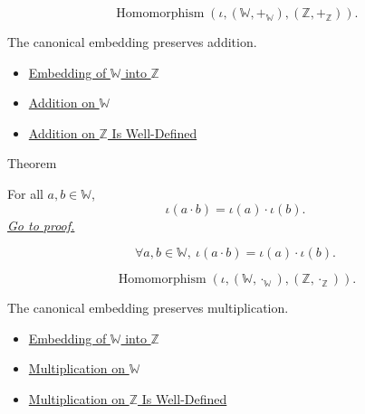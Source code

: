 \begin{remark*}
\[
\operatorname{Homomorphism}(\iota,(\mathbb{W},+_{\mathbb{W}}),(\mathbb{Z},+_{\mathbb{Z}})).
\]
\end{remark*}

\begin{remark*}[Interpretation]
The canonical embedding preserves addition.
\end{remark*}

\begin{dependencies}
\begin{itemize}
  \item \hyperref[def:canonical-embedding-w-into-z]{Embedding of $\mathbb{W}$ into $\mathbb{Z}$}
  \item \hyperref[def:addition-on-w]{Addition on $\mathbb{W}$}
  \item \hyperref[thm:addition-on-z-well-defined]{Addition on $\mathbb{Z}$ Is Well-Defined}
\end{itemize}
\end{dependencies}

\begin{theorembox}{Theorem}
\begin{theorem}
\label{thm:embedding-w-into-z-preserves-multiplication}
For all $a,b\in\mathbb{W}$,
\[
\iota(a\cdot b)=\iota(a)\cdot\iota(b).
\]
\hyperref[prf:embedding-w-into-z-preserves-multiplication]{\textit{Go to proof.}}
\end{theorem}
\end{theorembox}

\begin{remark*}
\[
\forall a,b\in\mathbb{W},\ \iota(a\cdot b)=\iota(a)\cdot\iota(b).
\]
\end{remark*}

\begin{remark*}
\[
\operatorname{Homomorphism}(\iota,(\mathbb{W},\cdot_{\mathbb{W}}),(\mathbb{Z},\cdot_{\mathbb{Z}})).
\]
\end{remark*}

\begin{remark*}[Interpretation]
The canonical embedding preserves multiplication.
\end{remark*}

\begin{dependencies}
\begin{itemize}
  \item \hyperref[def:canonical-embedding-w-into-z]{Embedding of $\mathbb{W}$ into $\mathbb{Z}$}
  \item \hyperref[def:multiplication-on-w]{Multiplication on $\mathbb{W}$}
  \item \hyperref[thm:multiplication-on-z-well-defined]{Multiplication on $\mathbb{Z}$ Is Well-Defined}
\end{itemize}
\end{dependencies}

